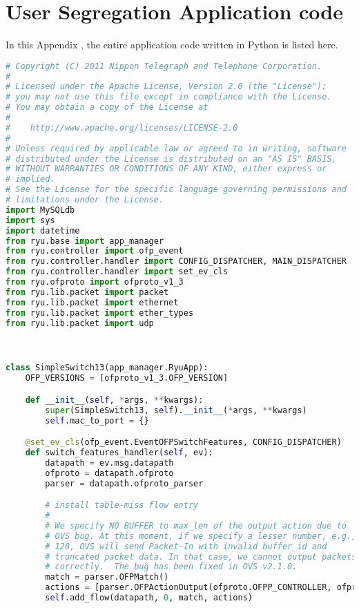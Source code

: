 
\chapter{User Segregation Application code}\label{app:ch:app_code}

In this Appendix , the entire application code written in Python is listed here.


\begin{lstlisting}[language = Python, caption={The User Segregation Mac Learning Application}, label={lst:userseg-code}]
# Copyright (C) 2011 Nippon Telegraph and Telephone Corporation.
#
# Licensed under the Apache License, Version 2.0 (the "License");
# you may not use this file except in compliance with the License.
# You may obtain a copy of the License at
#
#    http://www.apache.org/licenses/LICENSE-2.0
#
# Unless required by applicable law or agreed to in writing, software
# distributed under the License is distributed on an "AS IS" BASIS,
# WITHOUT WARRANTIES OR CONDITIONS OF ANY KIND, either express or
# implied.
# See the License for the specific language governing permissions and
# limitations under the License.
import MySQLdb
import sys
import datetime
from ryu.base import app_manager
from ryu.controller import ofp_event
from ryu.controller.handler import CONFIG_DISPATCHER, MAIN_DISPATCHER
from ryu.controller.handler import set_ev_cls
from ryu.ofproto import ofproto_v1_3
from ryu.lib.packet import packet
from ryu.lib.packet import ethernet
from ryu.lib.packet import ether_types
from ryu.lib.packet import udp



class SimpleSwitch13(app_manager.RyuApp):
	OFP_VERSIONS = [ofproto_v1_3.OFP_VERSION]

	def __init__(self, *args, **kwargs):
		super(SimpleSwitch13, self).__init__(*args, **kwargs)
		self.mac_to_port = {}

	@set_ev_cls(ofp_event.EventOFPSwitchFeatures, CONFIG_DISPATCHER)
	def switch_features_handler(self, ev):
		datapath = ev.msg.datapath
		ofproto = datapath.ofproto
		parser = datapath.ofproto_parser

		# install table-miss flow entry
		#
		# We specify NO BUFFER to max_len of the output action due to
		# OVS bug. At this moment, if we specify a lesser number, e.g.,
		# 128, OVS will send Packet-In with invalid buffer_id and
		# truncated packet data. In that case, we cannot output packets
		# correctly.  The bug has been fixed in OVS v2.1.0.
		match = parser.OFPMatch()
		actions = [parser.OFPActionOutput(ofproto.OFPP_CONTROLLER, ofproto.OFPCML_NO_BUFFER)]
		self.add_flow(datapath, 0, match, actions)


\end{lstlisting}
